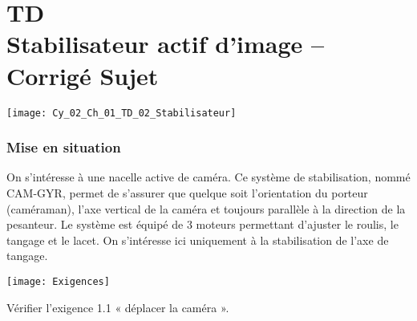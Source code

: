 \chapter*{TD  \\ 
Stabilisateur actif d'image -- \ifprof Corrigé \else Sujet \fi}

\iflivret {} \else
\ifprof  {} \else \fi
\fi

\setcounter{question}{0}

\begin{marginfigure}
\texttt{[image: Cy\_02\_Ch\_01\_TD\_02\_Stabilisateur]}
\end{marginfigure}

\subsection*{Mise en situation}
\ifprof
\else
On s'intéresse à une nacelle active de caméra. Ce système de stabilisation, nommé CAM-GYR, permet de s'assurer que quelque soit l'orientation du porteur (caméraman), l'axe vertical de la caméra et toujours parallèle à la direction de la pesanteur. 
Le système est équipé de 3 moteurs permettant d'ajuster le roulis, le tangage et le lacet. On s'intéresse ici uniquement à la stabilisation de l'axe de tangage. 

\begin{center}
\texttt{[image: Exigences]}
\end{center}
\fi
\begin{obj}
Vérifier l'exigence 1.1 « déplacer la caméra ». %
\end{obj}



